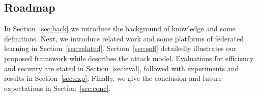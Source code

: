 \subsection{Roadmap} In Section~\ref{sec:back} we introduce the background of knowledge and some definitions. Next, we introduce related work and some platforms of federated learning in Section~\ref{sec:related}. Section~\ref{sec:sofl} detailedly illustrates our proposed framework while describes the attack model. Evaluations for efficiency and security are stated in Section~\ref{sec:eval}, followed with experiments and results in Section~\ref{sec:exp}. Finally, we give the conclusion and future expectations in Section~\ref{sec:conc}.